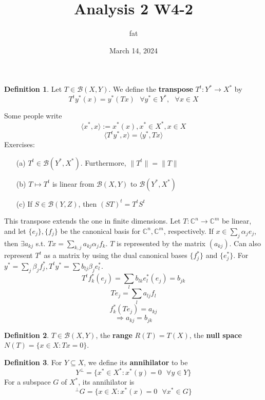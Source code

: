 \documentclass{article}
\title{Analysis 2 W4-2}
\author{fat}
\date{March 14, 2024}
\newcommand{\sfa}{\text{  } \forall}
\theoremstyle{definition}
\newtheorem{dfn}{Definition}
\begin{document}
\maketitle
\thispagestyle{fancy}
\renewcommand{\footrulewidth}{0.4pt}
\cfoot{\thepage}
\renewcommand{\headrulewidth}{0.4pt}

\begin{dfn}
	Let $T \in \mathcal{B}(X, Y)$.
	We define the \textbf{transpose} $T^t: Y^* \to X^*$ by 
	\[
		T^t y^*(x) = y^*(Tx) \sfa y^* \in Y^*, \sfa x \in X
	\]
\end{dfn}

Some people write 
\[
	\langle x^*, x\rangle := x^*(x), x^* \in X^*, x \in X
\]
\[
	\langle T^t y^*, x \rangle = \langle y^*, Tx \rangle
\]
Exercises:
\begin{enumerate}
	\item[(a)] $T^t \in \mathcal{B}(Y^*, X^*)$. Furthermore, $\|T^t\| = \|T\|$
		
	\item[(b)] $T \mapsto T^t$ is linear from $\mathcal{B}(X, Y)$ to $\mathcal{B}(Y^*, X^*)$
		
	\item[(c)] If $S \in \mathcal{B}(Y, Z)$, then $(ST)^t = T^t S^t$
\end{enumerate}

This transpose extends the one in finite dimensions.
Let $T:\mathbb{C}^n \to \mathbb{C}^m$ be linear, and let $\{e_j\}, \{f_j\}$ be the canonical basis for $\mathbb{C}^n, \mathbb{C}^m$, respectively.
If $x \in \sum_j \alpha_j e_j$, then $\exists a_{kj}$ s.t. $T x = \sum_{k, j} a_{kj} \alpha_j f_k$.
$T$ is represented by the matrix $(a_{kj})$.
Can also represent $T^t$ as a matrix by using the dual canonical bases $\{f_j^*\}$ and $\{e_j^*\}$.
For $y^* = \sum_{j} \beta_j f_j^*, T^t y^* = \sum b_{lj} \beta_j e_l^*$.
\[
	T^t f_k^*(e_j) = \sum_{l} b_{lk} e_l^*(e_j) = b_{jk}
\]
\[
	T e_j = \sum_l a_{lj} f_l
\]
\[
	f_k^*(T e_j) = a_{kj}
\]
\[
	\Rightarrow a_{kj} = b_{jk}
\]

\begin{dfn}
	$T \in \mathcal{B}(X, Y)$, the \textbf{range} $R(T) = T(X)$, the \textbf{null space} $N(T) = \{x \in X: T x= 0\}$.
\end{dfn}

\begin{dfn}
	For $Y \subseteq X$, we define its \textbf{annihilator} to be 
	\[
		Y^{\perp} = \{x^* \in X^*: x^*(y) = 0 \sfa y \in Y\}
	\]
	For a subspace $G$ of $X^*$, its annihilator is 
	\[
		^\perp G = \{x \in X: x^*(x) = 0 \sfa x^* \in G\}
	\]
\end{dfn}
\end{document}
